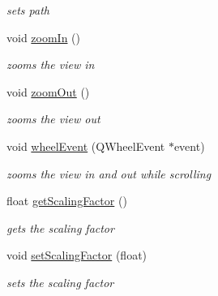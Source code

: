 \begin{DoxyCompactItemize}
\begin{DoxyCompactList}\small\item\em sets path \end{DoxyCompactList}\item 
\hypertarget{classMyArea_ae9e0f83ea174d928e90149e510a1ba6a}{void \hyperlink{classMyArea_ae9e0f83ea174d928e90149e510a1ba6a}{zoom\+In} ()}\label{classMyArea_ae9e0f83ea174d928e90149e510a1ba6a}

\begin{DoxyCompactList}\small\item\em zooms the view in \end{DoxyCompactList}\item 
\hypertarget{classMyArea_af3c32c10d3db89a2efba9c23ec029fe0}{void \hyperlink{classMyArea_af3c32c10d3db89a2efba9c23ec029fe0}{zoom\+Out} ()}\label{classMyArea_af3c32c10d3db89a2efba9c23ec029fe0}

\begin{DoxyCompactList}\small\item\em zooms the view out \end{DoxyCompactList}\item 
\hypertarget{classMyArea_ae3d11ed25247a029074808e88bae22f0}{void \hyperlink{classMyArea_ae3d11ed25247a029074808e88bae22f0}{wheel\+Event} (Q\+Wheel\+Event $\ast$event)}\label{classMyArea_ae3d11ed25247a029074808e88bae22f0}

\begin{DoxyCompactList}\small\item\em zooms the view in and out while scrolling \end{DoxyCompactList}\item 
\hypertarget{classMyArea_a7ad7ab4856b78cc6d8f18f1a7e6dd784}{float \hyperlink{classMyArea_a7ad7ab4856b78cc6d8f18f1a7e6dd784}{get\+Scaling\+Factor} ()}\label{classMyArea_a7ad7ab4856b78cc6d8f18f1a7e6dd784}

\begin{DoxyCompactList}\small\item\em gets the scaling factor \end{DoxyCompactList}\item 
\hypertarget{classMyArea_ac80eebebdb761f1189b4d7c020316596}{void \hyperlink{classMyArea_ac80eebebdb761f1189b4d7c020316596}{set\+Scaling\+Factor} (float)}\label{classMyArea_ac80eebebdb761f1189b4d7c020316596}

\begin{DoxyCompactList}\small\item\em sets the scaling factor \end{DoxyCompactList}\end{DoxyCompactItemize}

